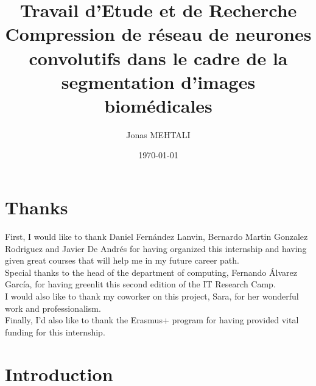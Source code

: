 \documentclass{article}
\title{Travail d'Etude et de Recherche \\
\LARGE{Compression de réseau de neurones convolutifs dans le cadre de la segmentation d’images biomédicales} \\
}
\author{Jonas MEHTALI}
\date{\today{}}
\begin{document}
\maketitle

\newpage

\tableofcontents

\newpage

\section{Thanks}
First, I would like to thank Daniel Fernández Lanvin, Bernardo Martin Gonzalez Rodriguez and Javier De Andrés for having organized this internship and having given great courses that will help me in my future career path.
\\
Special thanks to the head of the department of computing, Fernando Álvarez García, for having greenlit this second edition of the IT Research Camp.
\\
I would also like to thank my coworker on this project, Sara, for her wonderful work and professionalism.
\\
Finally, I'd also like to thank the Erasmus+ program for having provided vital funding for this internship.

\newpage
\section{Introduction}
\end{document}
